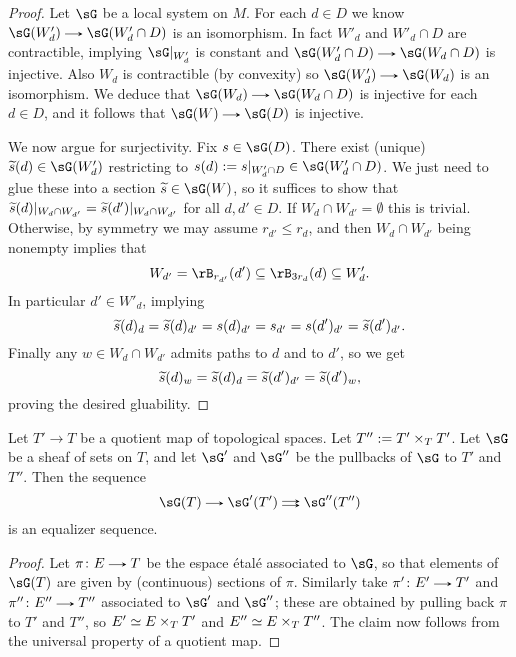 \begin{nothing}
\begin{sublemma}
\begin{proof}
      Let $\sG$ be a local system on $M$. For each $d \in D$ we know $\sG(W'_d) \to \sG(W'_d \cap D)$ is an isomorphism. In fact $W'_d$ and $W'_d \cap D$ are contractible, implying $\sG|_{W'_d}$ is constant and $\sG(W'_d \cap D) \to \sG(W_d \cap D)$ is injective. Also $W_d$ is contractible (by convexity) so $\sG(W'_d) \to \sG(W_d)$ is an isomorphism. We deduce that $\sG(W_d) \to \sG(W_d \cap D)$ is injective for each $d \in D$, and it follows that $\sG(W) \to \sG(D)$ is injective.

      We now argue for surjectivity. Fix $s \in \sG(D)$. There exist (unique) $\til{s}(d) \in \sG(W'_d)$ restricting to $s(d) \ce s|_{W'_d \cap D} \in \sG(W'_d \cap D)$. We just need to glue these into a section $\til{s} \in \sG(W)$, so it suffices to show that $\widetilde{s}(d)|_{W_d \cap W_{d'}} = \widetilde{s}(d')|_{W_d \cap W_{d'}}$ for all $d,d' \in D$. If $W_d \cap W_{d'} = \emptyset$ this is trivial. Otherwise, by symmetry we may assume $r_{d'} \le r_d$, and then $W_d \cap W_{d'}$ being nonempty implies that
      \[
        W_{d'} = \rB_{r_{d'}}(d') \subseteq \rB_{3r_d}(d) \subseteq W'_d.
      \]
      In particular $d' \in W'_d$, implying
      \[
        \widetilde{s}(d)_d = \widetilde{s}(d)_{d'} = s(d)_{d'} = s_{d'} = s(d')_{d'} = \widetilde{s}(d')_{d'}.
      \]
      Finally any $w \in W_d \cap W_{d'}$ admits paths to $d$ and to $d'$, so we get
      \[
        \widetilde{s}(d)_w = \widetilde{s}(d)_d = \widetilde{s}(d')_{d'} = \widetilde{s}(d')_w,
      \]
      proving the desired gluability.
    \end{proof}
  \end{sublemma}

  \begin{sublemma}
    \label{an-proof-espace}
    Let $T' \to T$ be a quotient map of topological spaces. Let $T'' \mathrel{:=} T' \times_T T'$. Let $\sG$ be a sheaf of sets on $T$, and let $\sG'$ and $\sG''$ be the pullbacks of $\sG$ to $T'$ and $T''$. Then the sequence
    \[
      \sG(T) \to \sG'(T') \doubto \sG''(T'')
    \]
    is an equalizer sequence.

    \begin{proof}
      Let $\pi \c E \to T$ be the espace \'etal\'e associated to $\sG$, so that elements of $\sG(T)$ are given by (continuous) sections of $\pi$. Similarly take $\pi' \c E' \to T'$ and $\pi'' \c E'' \to T''$ associated to $\sG'$ and $\sG''$; these are obtained by pulling back $\pi$ to $T'$ and $T''$, so $E' \simeq E \times_T T'$ and $E'' \simeq E \times_T T''$. The claim now follows from the universal property of a quotient map.
    \end{proof}
  \end{sublemma}
  

\end{nothing}
